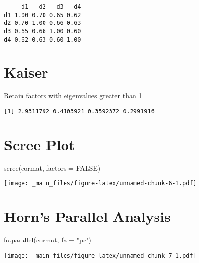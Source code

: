 \documentclass[
]{book}
\newenvironment{Shaded}{\begin{snugshade}}{\end{snugshade}}
\newcommand{\AttributeTok}[1]{\textcolor[rgb]{0.77,0.63,0.00}{#1}}
\newcommand{\ConstantTok}[1]{\textcolor[rgb]{0.00,0.00,0.00}{#1}}
\newcommand{\FunctionTok}[1]{\textcolor[rgb]{0.00,0.00,0.00}{#1}}
\newcommand{\NormalTok}[1]{#1}
\newcommand{\SpecialCharTok}[1]{\textcolor[rgb]{0.00,0.00,0.00}{#1}}
\newcommand{\StringTok}[1]{\textcolor[rgb]{0.31,0.60,0.02}{#1}}
\begin{document}
\begin{verbatim}
     d1   d2   d3   d4
d1 1.00 0.70 0.65 0.62
d2 0.70 1.00 0.66 0.63
d3 0.65 0.66 1.00 0.60
d4 0.62 0.63 0.60 1.00
\end{verbatim}

\hypertarget{kaiser}{%
\section{Kaiser}\label{kaiser}}

Retain factors with eigenvalues greater than 1

\begin{Shaded}
\end{Shaded}

\begin{verbatim}
[1] 2.9311792 0.4103921 0.3592372 0.2991916
\end{verbatim}

\hypertarget{scree-plot}{%
\section{Scree Plot}\label{scree-plot}}

\begin{Shaded}
\begin{Highlighting}[]
\FunctionTok{scree}\NormalTok{(cormat, }\AttributeTok{factors =} \ConstantTok{FALSE}\NormalTok{)}
\end{Highlighting}
\end{Shaded}

\texttt{[image: \_main\_files/figure-latex/unnamed-chunk-6-1.pdf]}

\hypertarget{horns-parallel-analysis}{%
\section{Horn's Parallel Analysis}\label{horns-parallel-analysis}}

\begin{Shaded}
\begin{Highlighting}[]
\FunctionTok{fa.parallel}\NormalTok{(cormat, }\AttributeTok{fa =} \StringTok{"pc"}\NormalTok{)}
\end{Highlighting}
\end{Shaded}

\texttt{[image: \_main\_files/figure-latex/unnamed-chunk-7-1.pdf]}
\end{document}
